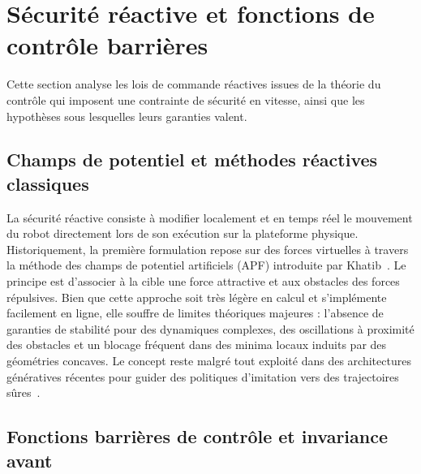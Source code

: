 \section{Sécurité réactive et fonctions de contrôle barrières}

Cette section analyse les lois de commande réactives issues de la théorie du contrôle qui imposent une contrainte de sécurité en vitesse, ainsi que les hypothèses sous lesquelles leurs garanties valent.

\subsection{Champs de potentiel et méthodes réactives classiques}\label{subsec:revue_apf}
La sécurité réactive consiste à modifier localement et en temps réel le mouvement du robot directement lors de son exécution sur la plateforme physique. Historiquement, la première formulation repose sur des forces virtuelles à travers la méthode des champs de potentiel artificiels (APF) introduite par Khatib~\cite{Khatib1986Real}. Le principe est d'associer à la cible une force attractive et aux obstacles des forces répulsives. Bien que cette approche soit très légère en calcul et s'implémente facilement en ligne, elle souffre de limites théoriques majeures : l'absence de garanties de stabilité pour des dynamiques complexes, des oscillations à proximité des obstacles et un blocage fréquent dans des minima locaux induits par des géométries concaves. Le concept reste malgré tout exploité dans des architectures génératives récentes pour guider des politiques d'imitation vers des trajectoires sûres~\cite{Ding2025Towards}.

\subsection{Fonctions barrières de contrôle et invariance avant}\label{subsec:revue_cbf_qp}

